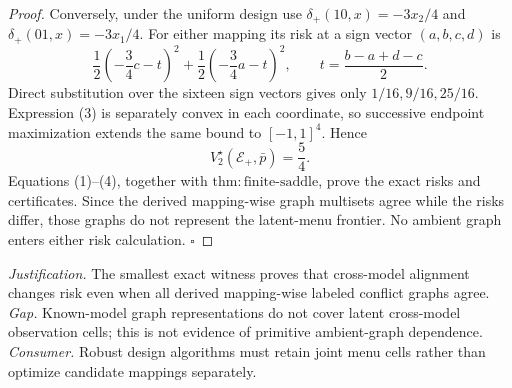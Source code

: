 \documentclass{article}
\begin{document}
\begin{proof}
Conversely, under the uniform design use \(\delta_+(10,x)=-3x_2/4\) and \(\delta_+(01,x)=-3x_1/4\). For either mapping its risk at a sign vector \((a,b,c,d)\) is
\[
 \frac12\left(-\frac34c-t\right)^2
 +\frac12\left(-\frac34a-t\right)^2,
 \qquad t=\frac{b-a+d-c}{2}. \tag{3}
\]
Direct substitution over the sixteen sign vectors gives only \(1/16,9/16,25/16\). Expression (3) is separately convex in each coordinate, so successive endpoint maximization extends the same bound to \([-1,1]^4\). Hence
\[
 V_2^\star(\mathcal E_+,\bar p)=\frac54. \tag{4}
\]
Equations (1)--(4), together with \(\mathrm{thm{:}finite\text{-}saddle}\), prove the exact risks and certificates. Since the derived mapping-wise graph multisets agree while the risks differ, those graphs do not represent the latent-menu frontier. No ambient graph enters either risk calculation. \(\square\)
\end{proof}
\par\smallskip\noindent \textit{Justification.} The smallest exact witness proves that cross-model alignment changes risk even when all derived mapping-wise labeled conflict graphs agree. \textit{Gap.} Known-model graph representations do not cover latent cross-model observation cells; this is not evidence of primitive ambient-graph dependence. \textit{Consumer.} Robust design algorithms must retain joint menu cells rather than optimize candidate mappings separately.
\end{document}
